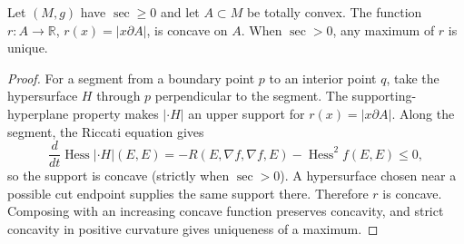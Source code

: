 \begin{lemma}
  \label{lem:pet-ch12-distance-to-boundary-concave}

  Let $(M,g)$ have $\sec\ge0$ and let $A\subset M$ be totally convex. The
  function $r:A\to\mathbb{R}$, $r(x)=|x\partial A|$, is concave on $A$. When
  $\sec>0$, any maximum of $r$ is unique.
\end{lemma}
\begin{proof}
  \sketch
  For a segment from a boundary point \(p\) to an interior point \(q\), take
  the hypersurface \(H\) through \(p\) perpendicular to the segment. The
  supporting-hyperplane property makes \( |\cdot H|\) an upper support for
  \(r(x)=|x\partial A|\). Along the segment, the Riccati equation gives
  \[ \frac{d}{dt}\operatorname{Hess}|\cdot H|(E,E)
     =-R(E,\nabla f,\nabla f,E)-\operatorname{Hess}^2f(E,E)\le0, \]
  so the support is concave (strictly when \(\sec>0\)). A hypersurface chosen
  near a possible cut endpoint supplies the same support there. Therefore \(r\)
  is concave. Composing with an increasing concave function preserves
  concavity, and strict concavity in positive curvature gives uniqueness of a
  maximum.
\end{proof}


